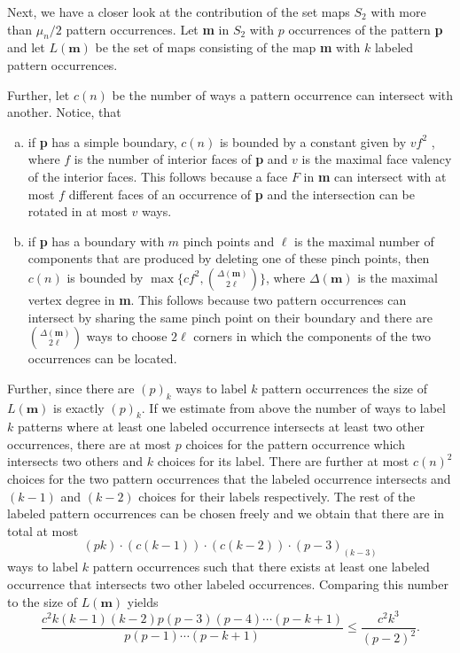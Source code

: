 \documentclass[reqno, 11pt]{amsart}
\theoremstyle{definition}
\theoremstyle{remark}
\newcommand{\map}[1]{\textbf{#1}}
\numberwithin{equation}{section}
\begin{document}
Next, we have a closer look at the contribution of the set maps $S_2$ with more than $\mu_n/2$ pattern occurrences. Let \map{m} in $S_2$ with $p$ occurrences of the pattern \map{p} and let $L(\map{m})$ be the set of maps consisting of the map \map{m} with $k$ labeled pattern occurrences. 

Further, let $c(n)$ be the number of ways a pattern occurrence can intersect with another. Notice, that 
\begin{enumerate}[(a)]
    \item if \map{p} has a simple boundary, $c(n)$ is bounded by a constant given by $vf^2$ , where $f$ is the number of interior faces of \map{p} and $v$ is the maximal face valency of the interior faces. This follows because a face $F$ in \map{m} can intersect with at most $f$ different faces of an occurrence of \map{p} and the intersection can be rotated in at most $v$ ways.
    \item if \map{p} has a boundary with $m$ pinch points and $\ell$ is the maximal number of components that are produced by deleting one of these pinch points, then $c(n)$ is bounded by $\max\{cf^2, \binom{\Delta(\map{m})}{2\ell}\}$, where $\Delta(\map{m})$ is the maximal vertex degree in \map{m}. This follows because two pattern occurrences can intersect by sharing the same pinch point on their boundary and there are $\binom{\Delta(\map{m})}{2\ell}$ ways to choose $2\ell$ corners in which the components of the two occurrences can be located.
\end{enumerate}

Further, since there are $(p)_k$ ways to label $k$ pattern occurrences the size of $L(\map{m})$ is exactly $(p)_k$.
If we estimate from above the number of ways to label $k$ patterns where at least one labeled occurrence intersects at least two other occurrences, there are at most $p$ choices for the pattern occurrence which intersects two others and $k$ choices for its label. There are further at most $c(n)^2$ choices for the two pattern occurrences that the labeled occurrence intersects and $(k-1)$ and $(k-2)$ choices for their labels respectively. The rest of the labeled pattern occurrences can be chosen freely and we obtain that there are in total at most
\[
    (pk)\cdot \left(c(k-1)\right)\cdot \left(c(k-2)\right)\cdot (p-3)_{(k-3)}
\]
ways to label $k$ pattern occurrences such that there exists at least one labeled occurrence that intersects two other labeled occurrences. Comparing this number to the size of $L(\map{m})$ yields
\[
    \frac{c^2k(k-1)(k-2)p(p-3)(p-4)\cdots (p-k+1)}{p(p-1)\cdots (p-k+1)} \leq \frac{c^2k^3}{(p-2)^2}.
\]
\end{document}
